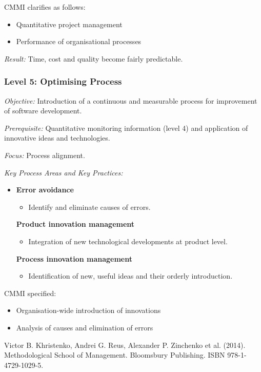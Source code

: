 \documentclass[11pt,a4paper]{article}
\begin{document}
CMMI clarifies as follows:
\begin{itemize}[noitemsep]
\item Quantitative project management
\item Performance of organisational processes
\end{itemize}

\emph{Result:} Time, cost and quality become fairly predictable.

\subsubsection*{Level 5: Optimising Process}

\emph{Objective:} Introduction of a continuous and measurable process for
improvement of software development.

\emph{Prerequisite:} Quantitative monitoring information (level 4) and
application of innovative ideas and technologies.

\emph{Focus:} Process alignment.

\emph{Key Process Areas and Key Practices:}
\begin{itemize}[noitemsep]
\item \textbf{Error avoidance}
  \begin{itemize}[noitemsep]
  \item Identify and eliminate causes of errors.
  \end{itemize}
\textbf{Product innovation management}
  \begin{itemize}[noitemsep]
  \item Integration of new technological developments at product level.  
  \end{itemize}
\textbf{Process innovation management}
  \begin{itemize}[noitemsep]
  \item Identification of new, useful ideas and their orderly introduction.
  \end{itemize}
\end{itemize}
CMMI specified:
\begin{itemize}[noitemsep]
\item Organisation-wide introduction of innovations
\item Analysis of causes and elimination of errors
\end{itemize}


\begin{thebibliography}{xxx}
 Victor B. Khristenko, Andrei G. Reus, Alexander P. Zinchenko et
  al. (2014). Methodological School of Management. Bloomsbury Publishing. ISBN
  978-1-4729-1029-5.
\end{thebibliography}
\end{document}
